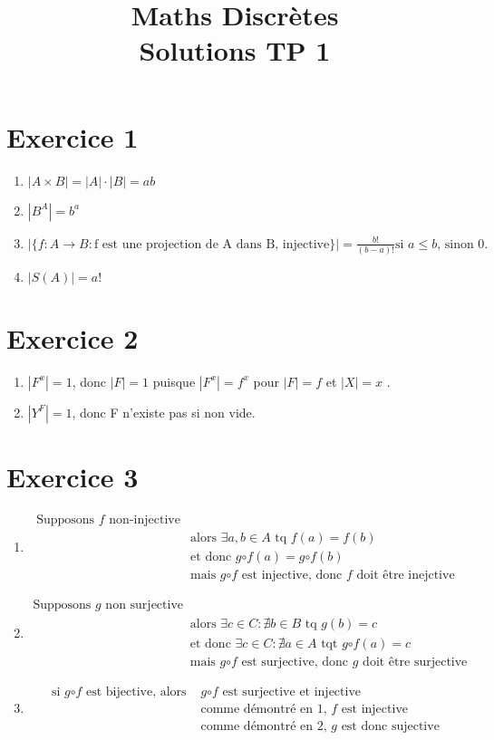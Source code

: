 \documentclass[fontsize=10pt]{article}
\title{\textbf{Maths Discrètes}\\ Solutions TP 1}
\date{}
\begin{document}
\maketitle %


\section*{Exercice 1}
\begin{enumerate}
\item $|A\times B | = |A|\cdot|B|=ab$
\item $|B^A|=b^a$
\item $|\{f:A \rightarrow B : \text{f est une projection de A dans B, injective}\}| = \frac{b!}{(b-a)!}\text{si $a \leq b$, sinon 0.}$
\item $|S(A)| = a!$
\end{enumerate}
\section*{Exercice 2}
\begin{enumerate}
\item $|F^x| = 1$, donc $|F|=1$ puisque $|F^x|=f^x$ pour $|F|=f$ et $|X|=x$ .
\item $|Y^F|=1$, donc F n'existe pas si non vide.
\end{enumerate}

\section*{Exercice 3}
\begin{enumerate}
\item \begin{align*}
\text{Supposons $f$ non-injective}&\\
&\text{alors } \exists a,b \in A \text{ tq } f(a)=f(b)\\
&\text{et donc } g\mathord\circ f (a) = g\mathord\circ f (b)\\
&\text{mais }g\mathord\circ f \text{ est injective, donc $f$ doit être inejctive}
\end{align*}
\item \begin{align*}
\text{Supposons $g$ non surjective}& \\
&\text{alors } \exists c \in C : \nexists b \in B \text{ tq } g(b) = c\\
&\text{et donc }\exists c \in C : \nexists a \in A \text{ tqt } g\mathord\circ f(a ) = c\\
&\text{mais $g\mathord\circ f$ est surjective, donc $g$ doit être surjective}
\end{align*}
\item \begin{align*}
\text{si $g\mathord\circ f$ est bijective, alors }&\text{$g\mathord\circ f$ est surjective et injective}\\
& \text{comme démontré en 1, $f$ est injective}\\
& \text{comme démontré en 2, $g$ est donc sujective}
\end{align*}
\end{enumerate}
\end{document}
